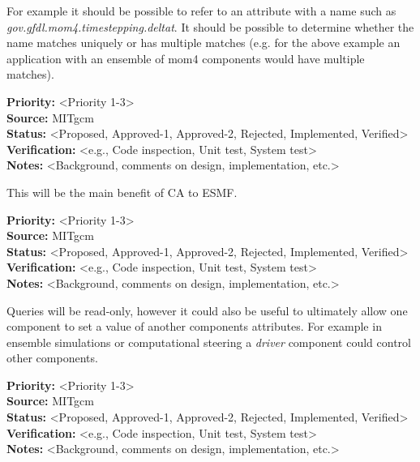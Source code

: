 For example it should be possible to refer to an attribute with a
name such as {\it gov.gfdl.mom4.timestepping.deltat}. It should
be possible to determine whether the name matches uniquely or has
multiple matches (e.g. for the above example an application
with an ensemble of mom4 components would have multiple matches).

\begin{reqlist}
{\bf Priority:} <Priority 1-3> \\
{\bf Source:} MITgcm \\
{\bf Status:} <Proposed, Approved-1, Approved-2, Rejected, Implemented, Verified> \\
{\bf Verification:} <e.g., Code inspection, Unit test, System test> \\
{\bf Notes:} <Background, comments on design, implementation, etc.> 
\end{reqlist}

This will be the main benefit of CA to ESMF.

\begin{reqlist}
{\bf Priority:} <Priority 1-3> \\
{\bf Source:} MITgcm \\
{\bf Status:} <Proposed, Approved-1, Approved-2, Rejected, Implemented, Verified> \\
{\bf Verification:} <e.g., Code inspection, Unit test, System test> \\
{\bf Notes:} <Background, comments on design, implementation, etc.> 
\end{reqlist}

Queries will be read-only, however it could also be useful to ultimately allow 
one component to set a value of another components attributes. For example in
ensemble simulations or computational steering a {\it driver} component could
control other components.

\begin{reqlist}
{\bf Priority:} <Priority 1-3> \\
{\bf Source:} MITgcm \\
{\bf Status:} <Proposed, Approved-1, Approved-2, Rejected, Implemented, Verified> \\
{\bf Verification:} <e.g., Code inspection, Unit test, System test> \\
{\bf Notes:} <Background, comments on design, implementation, etc.> 
\end{reqlist}
